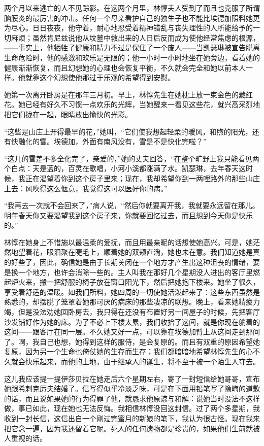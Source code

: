 \par 两个月以来逃亡的人不见踪影。在这两个月里，林惇夫人受到了而且也克服了所谓脑膜炎的最厉害的冲击。任何一个母亲看护自己的独生子也不能比埃德加照料她更为尽心。日日夜夜，他守着，耐心地忍受着精神错乱与丧失理性的人所能给予的一切麻烦；虽然肯尼兹说他从坟墓中救出来的人日后反而成为使他经常焦虑的根源，——事实上，他牺牲了健康和精力不过是保住了一个废人——当凯瑟琳被宣告脱离生命危险时，他的感激和欢乐是无限的；他一小时一小时地坐在她旁边，看着她的健康渐渐恢复，而且幻想她的心理也会恢复平衡，不久就会完全和她以前本人一样。他就靠这个幻想使他那过于乐观的希望得到安慰。
\par 她第一次离开卧房是在那年三月初。早上，林惇先生在她枕上放一束金色的藏红花。她已经有好久不习惯一点欢乐的光辉，当她醒来一看见这些花，就兴高采烈地把它们拢在一起，眼睛放出愉快的光彩。
\par “这些是山庄上开得最早的花，”她叫，“它们使我想起轻柔的暖风，和煦的阳光，还有快融化的雪。埃德加，外面有南风没有，雪是不是快化完啦？”
\par “这儿的雪差不多全化完了，亲爱的，”她的丈夫回答，“在整个旷野上我只能看见两个白点：天是蓝的，百灵在歌唱，小河小溪都涨满了水。凯瑟琳，去年春天这时候，我正在渴望着你到这个房子里来；现在，我却希望你到一两哩路外的那些山庄上去：风吹得这么惬意，我觉得这可以医好你的病。”
\par “我再去一次就不会回来了，”病人说，“然后你就要离开我，我就要永远留在那儿。明年春天你又要渴望我到这个房子来，你就要回忆过去，而且想到今天你是快乐的。”
\par 林惇在她身上不惜施以最温柔的爱抚，而且用最亲昵的话想使她高兴。可是，她茫然地望着花，眼泪聚在睫毛上，顺着她的双颊直淌，她也未在意。我们知道她是真的好些了，因此，确信她是由于长期关闭在一个地方才产生出这种沮丧的情绪，要是换一个地方，也许会消除一些的。主人叫我在那好几个星期没人进出的客厅里燃起炉火来，搬一把舒服的椅子放在窗口阳光下，然后把她抱下楼来。她坐了很久，享受着舒适的温暖。如我们所料，她四周的一切使她活泼起来了：这些东西虽然是熟悉的，却摆脱了笼罩着她那可厌的病床的那些凄凉的联想。晚上，看来她精疲力竭，但是没法劝她回卧房去，我只得在还没有布置好另一间屋子的时候，先把客厅沙发铺好作为她的床。为了不必上下楼太累，我们收拾了这间，就是你现在躺着的这间——跟客厅在同一层。不久她又好一点，可以靠在埃德加臂上从这间走到那间了。啊，我自己也想，她得到这样的服侍，是会复原的。而且有双重的原因希望她复原，因为另一个生命也倚仗她的生存而生存；我们都暗暗地希望林惇先生的心不久就会快乐起来，而他的土地，由于继承人的诞生，将不至于被一个陌生人夺去。
\par 这儿我应该提一提伊莎贝拉在她走后六个星期左右，寄了一封短信给她哥哥，宣布她跟希刺克厉夫结婚了。信写得似乎冷淡乏味，可是在下面用铅笔写了隐晦的道歉的话，而且说如果她的行为得罪了他，就恳求他原谅与和解：说她当时没法不这样做，事已如此，现在她也无法反悔。我相信林惇没回这封信。过了两个多星期，我收到一封长信，这信出自一个刚过完蜜月的新娘的笔下，我认为很古怪。现在我来把它念一遍，因为我还留着它呢。死人的任何遗物都是珍贵的，如果他们生前就被人重视的话。
